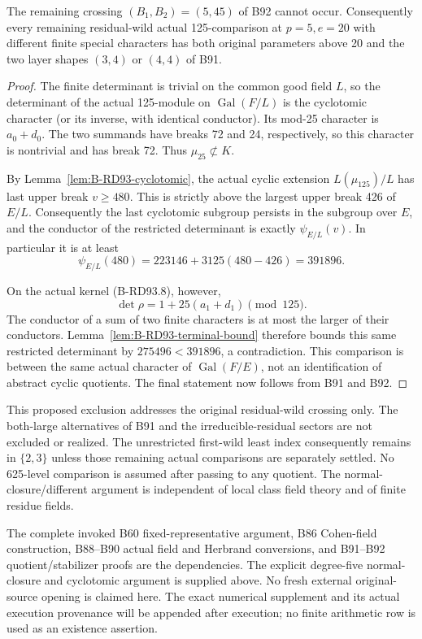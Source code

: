 \begin{theorem}
\label{thm:B-RD93-crossing}
The remaining crossing \((B_1,B_2)=(5,45)\) of B92 cannot
occur. Consequently every remaining residual-wild actual
125-comparison at \(p=5,e=20\) with different finite special
characters has both original parameters above 20 and the
two layer shapes \((3,4)\) or \((4,4)\) of B91.
\end{theorem}
\begin{proof}
The finite determinant is trivial on the common good field
\(L\), so the determinant of the actual 125-module on
\(\operatorname{Gal}(F/L)\) is the cyclotomic character
(or its inverse, with identical conductor). Its mod-25
character is \(a_0+d_0\). The two summands have breaks
72 and 24, respectively, so this character is nontrivial
and has break 72. Thus \(\mu _{25}\not\subset K\).

By Lemma~\ref{lem:B-RD93-cyclotomic}, the actual cyclic
extension \(L(\mu _{125})/L\) has last upper break
\(v\ge480\). This is strictly above the largest upper
break 426 of \(E/L\). Consequently the last cyclotomic
subgroup persists in the subgroup over \(E\), and the
conductor of the restricted determinant is exactly
\(\psi_{E/L}(v)\). In particular it is at least
\[
 \psi_{E/L}(480)=223146+3125(480-426)=391896.             \tag{B-RD93.16}
\]

On the actual kernel (B-RD93.8), however,
\[
                  \det\rho=1+25(a_1+d_1)\pmod {125}.
\]
The conductor of a sum of two finite characters is at most
the larger of their conductors. Lemma~\ref{lem:B-RD93-terminal-bound}
therefore bounds this same restricted determinant by
\(275496<391896\), a contradiction. This comparison is
between the same actual character of \(\operatorname{Gal}(F/E)\),
not an identification of abstract cyclic quotients.
The final statement now follows from B91 and B92.
\end{proof}

\begin{remark}
\label{rem:B-RD93-scope}
This proposed exclusion addresses the original residual-wild
crossing only. The both-large alternatives of B91 and the
irreducible-residual sectors are not excluded or realized.
The unrestricted first-wild least index consequently remains
in \(\{2,3\}\) unless those remaining actual comparisons are
separately settled. No 625-level comparison is assumed after
passing to any quotient. The normal-closure/different argument
is independent of local class field theory and of finite
residue fields.

The complete invoked B60 fixed-representative argument,
B86 Cohen-field construction, B88--B90 actual field and
Herbrand conversions, and B91--B92 quotient/stabilizer proofs
are the dependencies. The explicit degree-five normal-closure
and cyclotomic argument is supplied above. No fresh external
original-source opening is claimed here. The exact numerical
supplement and its actual execution provenance will be
appended after execution; no finite arithmetic row is used
as an existence assertion.
\end{remark}
